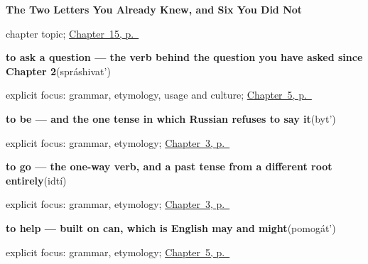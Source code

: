 \noindent\begin{minipage}[t]{\linewidth}
\raggedright
\textbf{The Two Letters You Already Knew, and Six You Did Not}\par
\footnotesize chapter topic; \hyperref[ch:ru-script-eight]{Chapter~15, p.~\pageref*{ch:ru-script-eight}}
\end{minipage}\par\smallskip

\noindent\begin{minipage}[t]{\linewidth}
\raggedright
\textbf{to ask a question — the verb behind the question you have asked since Chapter 2}\enspace\emph{}\enspace(spráshivat')\par
\footnotesize explicit focus: grammar, etymology, usage and culture; \hyperref[ch:russian-verbs-of-the-hand]{Chapter~5, p.~\pageref*{ch:russian-verbs-of-the-hand}}
\end{minipage}\par\smallskip

\noindent\begin{minipage}[t]{\linewidth}
\raggedright
\textbf{to be — and the one tense in which Russian refuses to say it}\enspace\emph{}\enspace(byt')\par
\footnotesize explicit focus: grammar, etymology; \hyperref[ch:russian-first-verbs]{Chapter~3, p.~\pageref*{ch:russian-first-verbs}}
\end{minipage}\par\smallskip

\noindent\begin{minipage}[t]{\linewidth}
\raggedright
\textbf{to go — the one-way verb, and a past tense from a different root entirely}\enspace\emph{}\enspace(idtí)\par
\footnotesize explicit focus: grammar, etymology; \hyperref[ch:russian-first-verbs]{Chapter~3, p.~\pageref*{ch:russian-first-verbs}}
\end{minipage}\par\smallskip

\noindent\begin{minipage}[t]{\linewidth}
\raggedright
\textbf{to help — built on can, which is English may and might}\enspace\emph{}\enspace(pomogát')\par
\footnotesize explicit focus: grammar, etymology; \hyperref[ch:russian-verbs-of-the-hand]{Chapter~5, p.~\pageref*{ch:russian-verbs-of-the-hand}}
\end{minipage}\par\smallskip


